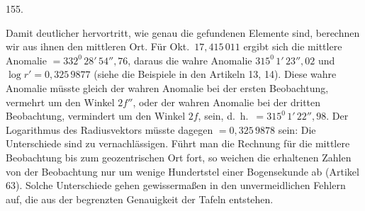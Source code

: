 \par{}\medskip
\hypertarget{native-209-article155}{}
\begin{center}155.\end{center}
Damit deutlicher hervortritt, wie genau die gefundenen Elemente sind, berechnen wir aus ihnen den mittleren Ort. Für Okt.\ $17{,}415\,011$ ergibt sich die mittlere Anomalie $=332^{0}\,28'\,54''{,}76$, daraus die wahre Anomalie $315^{0}\,1'\,23''{,}02$ und $\log r'=0{,}325\,9877$ (siehe die Beispiele in den Artikeln 13, 14). Diese wahre Anomalie müsste gleich der wahren Anomalie bei der ersten Beobachtung, vermehrt um den Winkel $2f''$, oder der wahren Anomalie bei der dritten Beobachtung, vermindert um den Winkel $2f$, sein, d.\ h.\ $=315^{0}\,1'\,22''{,}98$. Der Logarithmus des Radiusvektors müsste dagegen $=0{,}325\,9878$ sein: Die Unterschiede sind zu vernachlässigen. Führt man die Rechnung für die mittlere Beobachtung bis zum geozentrischen Ort fort, so weichen die erhaltenen Zahlen von der Beobachtung nur um wenige Hundertstel einer Bogensekunde ab (Artikel 63). Solche Unterschiede gehen gewissermaßen in den unvermeidlichen Fehlern auf, die aus der begrenzten Genauigkeit der Tafeln entstehen.

